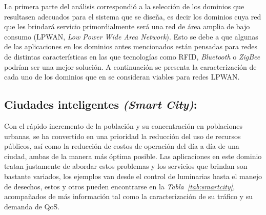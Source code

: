 La primera parte del análisis correspondió a la selección de los dominios que resultasen adecuados para el sistema que se diseña, es decir los dominios cuya red que les brindará servicio primordialmente será una red de área amplia de bajo consumo (LPWAN, \textit{Low Power Wide Area Network}). Esto se debe a que algunas de las aplicaciones en los dominios antes mencionados están pensadas para redes de distintas características en las que tecnologías como RFID, \textit{Bluetooth }o \textit{ZigBee }podrían ser una mejor solución. A continuación se presenta la caracterización de cada uno de los dominios que en \parencite{NetTrafficIoT} se consideran viables para redes LPWAN.\newline

\subsection{Ciudades inteligentes \textit{(Smart City)}:}

Con el rápido incremento de la población y su concentración en poblaciones urbanas, se ha convertido en una prioridad la reducción del uso de recursos públicos, así como la reducción de costos de operación del día a día de una ciudad, ambas de la manera más óptima posible. Las aplicaciones en este dominio tratan justamente de abordar estos problemas y los servicios que brindan son bastante variados, los ejemplos van desde el control de luminarias hasta el manejo de desechos, estos y otros  pueden encontrarse en la \textit{Tabla~\ref{tab:smartcity}}, acompañados de más información tal como la caracterización de su tráfico y su demanda de QoS.\newline

